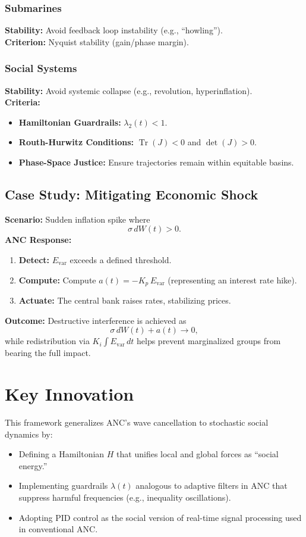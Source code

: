 \documentclass{article}
\theoremstyle{definition}
\begin{document}
\subsubsection{Submarines}
\textbf{Stability:} Avoid feedback loop instability (e.g., ``howling'').\\[1mm]
\textbf{Criterion:} Nyquist stability (gain/phase margin).

\subsubsection{Social Systems}
\textbf{Stability:} Avoid systemic collapse (e.g., revolution, hyperinflation).\\[1mm]
\textbf{Criteria:}
\begin{itemize}
    \item \textbf{Hamiltonian Guardrails:} \( \lambda_2(t) < 1 \).
    \item \textbf{Routh-Hurwitz Conditions:} \( \operatorname{Tr}(J) < 0 \) and \( \det(J) > 0 \).
    \item \textbf{Phase-Space Justice:} Ensure trajectories remain within equitable basins.
\end{itemize}

\subsection{Case Study: Mitigating Economic Shock}

\textbf{Scenario:} Sudden inflation spike where
\[
\sigma\, dW(t) > 0.
\]
\textbf{ANC Response:}
\begin{enumerate}
    \item \textbf{Detect:} \( E_{\text{var}} \) exceeds a defined threshold.
    \item \textbf{Compute:} Compute \( a(t) = -K_p\, E_{\text{var}} \) (representing an interest rate hike).
    \item \textbf{Actuate:} The central bank raises rates, stabilizing prices.
\end{enumerate}
\textbf{Outcome:} Destructive interference is achieved as
\[
\sigma\, dW(t) + a(t) \rightarrow 0,
\]
while redistribution via \( K_i \int E_{\text{var}}\, dt \) helps prevent marginalized groups from bearing the full impact.

\section{Key Innovation}
This framework generalizes ANC’s wave cancellation to stochastic social dynamics by:
\begin{itemize}
    \item Defining a Hamiltonian \( H \) that unifies local and global forces as ``social energy.''
    \item Implementing guardrails \( \lambda(t) \) analogous to adaptive filters in ANC that suppress harmful frequencies (e.g., inequality oscillations).
    \item Adopting PID control as the social version of real-time signal processing used in conventional ANC.
\end{itemize}
\end{document}
